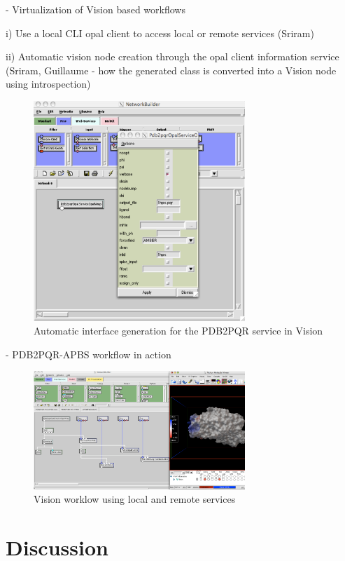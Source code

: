 \documentclass[conference]{IEEEtran}
\begin{document}
- Virtualization of Vision based workflows

  i) Use a local CLI opal client to access local or remote services (Sriram)

 ii) Automatic vision node creation through the opal client information
 service (Sriram, Guillaume - how the generated class is converted into a Vision node using introspection)

\begin{figure}
\begin{center}
\includegraphics[width=8cm]{vision-gui}
\end{center}
\caption{Automatic interface generation for the PDB2PQR service in Vision}
\label{fig:vision-gui}
\end{figure}

- PDB2PQR-APBS workflow in action

\begin{figure}
\begin{center}
\includegraphics[width=8cm]{vision-workflow}
\end{center}
\caption{Vision worklow using local and remote services}
\label{fig:vision-workflow}
\end{figure}

\section {Discussion}
\end{document}
